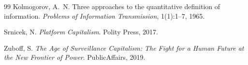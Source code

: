 \documentclass[11pt,a4paper]{article}
\theoremstyle{plain}
\theoremstyle{definition}
\theoremstyle{remark}
\begin{document}
\begin{thebibliography}{99}
Kolmogorov, A.~N.
\newblock Three approaches to the quantitative definition of information.
\newblock \emph{Problems of Information Transmission}, 1(1):1--7, 1965.

Srnicek, N.
\newblock \emph{Platform Capitalism}.
\newblock Polity Press, 2017.

Zuboff, S.
\newblock \emph{The Age of Surveillance Capitalism: The Fight for a Human
  Future at the New Frontier of Power}.
\newblock PublicAffairs, 2019.

\end{thebibliography}
\end{document}
